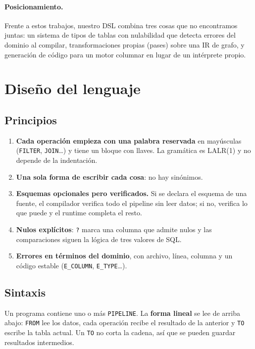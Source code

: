 \documentclass[sigplan,screen,nonacm]{acmart}
\begin{document}
\paragraph{Posicionamiento.}
Frente a estos trabajos, nuestro DSL combina tres cosas que no encontramos juntas: un
sistema de tipos de tablas con nulabilidad que detecta errores del dominio al compilar,
transformaciones propias (pases) sobre una IR de grafo, y generación de código para un motor
columnar en lugar de un intérprete propio.

\section{Diseño del lenguaje}
\label{sec:diseno}

\subsection{Principios}
\begin{enumerate}
  \item \textbf{Cada operación empieza con una palabra reservada} en mayúsculas
    (\texttt{FILTER}, \texttt{JOIN}\ldots) y tiene un bloque con llaves. La gramática es
    LALR(1) y no depende de la indentación.
  \item \textbf{Una sola forma de escribir cada cosa}: no hay sinónimos.
  \item \textbf{Esquemas opcionales pero verificados.} Si se declara el esquema de una
    fuente, el compilador verifica todo el pipeline sin leer datos; si no, verifica lo que
    puede y el runtime completa el resto.
  \item \textbf{Nulos explícitos}: \texttt{?} marca una columna que admite nulos y las
    comparaciones siguen la lógica de tres valores de SQL.
  \item \textbf{Errores en términos del dominio}, con archivo, línea, columna y un código
    estable (\texttt{E\_COLUMN}, \texttt{E\_TYPE}\ldots).
\end{enumerate}

\subsection{Sintaxis}
Un programa contiene uno o más \texttt{PIPELINE}. La \textbf{forma lineal} se lee de arriba
abajo: \texttt{FROM} lee los datos, cada operación recibe el resultado de la anterior y
\texttt{TO} escribe la tabla actual. Un \texttt{TO} no corta la cadena, así que se pueden
guardar resultados intermedios.
\end{document}
